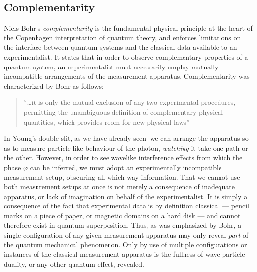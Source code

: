 
\subsection{Complementarity}
\label{sec:complementarity}
Niels Bohr's \emph{complementarity} is the fundamental physical principle at the heart of the Copenhagen interpretation of quantum theory, and enforces limitations on the interface between quantum systems and the classical data available to an experimentalist. It states that in order to observe complementary properties of a quantum system, an experimentalist must necessarily employ mutually incompatible arrangements of the measurement apparatus. Complementarity was characterized by Bohr as follows:
\begin{quote}
    ``\ldots it is only the mutual exclusion of any two experimental procedures, permitting the unambiguous definition of complementary physical quantities, which provides room for new physical laws'' \cite{Bohr1935a}
\end{quote}
In Young's double slit, as we have already seen, we can arrange the apparatus so as to measure particle-like behaviour of the photon, \emph{watching} it take one path or the other. However, in order to see wavelike interference effects from which the phase $\varphi$ can be inferred, we must adopt an experimentally incompatible measurement setup, obscuring all which-way information. That we cannot use both measurement setups at once is not merely a consequence of inadequate apparatus, or lack of imagination on behalf of the experimentalist.  It is simply a consequence of the fact that experimental data is by definition classical --- pencil marks on a piece of paper,  or magnetic domains on a hard disk --- and cannot therefore exist in quantum superposition.  Thus, as was emphasized by Bohr, a single configuration of any given measurement apparatus may only reveal \emph{part} of the quantum mechanical phenomenon. Only by use of multiple configurations or instances of the classical measurement apparatus is the fullness of wave-particle duality, or any other quantum effect, revealed. 

